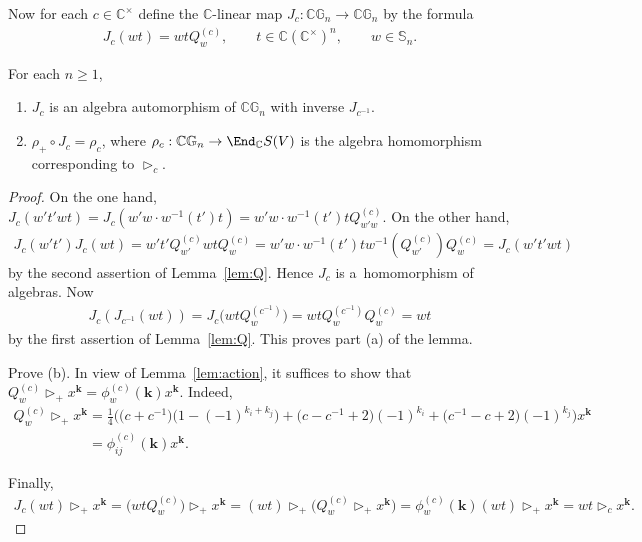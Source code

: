 Now for each $c\in\mathbb C^\times$ def\/ine the $\mathbb C$-linear map $J_c\colon \mathbb C\mathbb G_n\to \mathbb
C\mathbb G_n$ by the formula
\begin{gather*}
J_c(wt)=wtQ^{(c)}_w,
\qquad
t\in \mathbb C(\mathbb C^\times)^n,
\qquad
w\in \mathbb S_n.
\end{gather*}
\begin{Lemma}\label{lem:J_c}
For each $n\ge 1$,
\begin{enumerate}\itemsep=0pt
\item[$(a)$] $J_c$ is an algebra automorphism of $\mathbb C \mathbb G_n$ with inverse $J_{c^{-1}}$.

\item[$(b)$] $\rho_+\circ J_c=\rho_c$, where $\rho_c:\mathbb C \mathbb G_n\to \End_\mathbb C S(V)$ is the algebra homomorphism
corresponding to $\mathop{\triangleright}\nolimits_c$.
\end{enumerate}
\end{Lemma}

\begin{proof}
On the one hand, $J_c(w't'w t)=J_c(w'w\cdot w^{-1}(t')t)=w'w \cdot w^{-1}(t')tQ_{w'w}^{(c)}$.
On the other hand,
\begin{gather*}
J_c(w't')J_c(w t) = w't'Q_{w'}^{(c)} wt Q^{(c)}_w=w'w \cdot w^{-1}(t')tw^{-1}(Q_{w'}^{(c)}) Q_w^{(c)}=J_c(w't'wt)
\end{gather*}
by the second assertion of Lemma~\ref{lem:Q}.
Hence $J_c$ is a~homomorphism of algebras.
Now{\samepage
\begin{gather*}
J_c(J_{c^{-1}}(wt))=J_c\big(wtQ_w^{(c^{-1})}\big)=wtQ_w^{(c^{-1})}Q_w^{(c)}=wt
\end{gather*}
by the f\/irst assertion of Lemma~\ref{lem:Q}.
This proves part (a) of the lemma.}

Prove (b).
In view of Lemma~\ref{lem:action}, it suf\/f\/ices to show that $Q_w^{(c)}\mathop{\triangleright}\nolimits_+ x^{\mathbf
k}=\phi_w^{(c)}(\mathbf k) x^{\mathbf k}$.
Indeed,
\begin{gather*}
Q_w^{(c)}\mathop{\triangleright}\nolimits_+ x^{\mathbf k}
= \frac14 \big(\big(c+c^{-1}\big)\big(1-(-1)^{k_i+k_j}\big)+\big(c-c^{-1}+2\big)(-1)^{k_i}+\big(c^{-1}-c+2\big)(-1)^{k_j}\big)x^{\mathbf k}
\\
\phantom{Q_w^{(c)}\mathop{\triangleright}\nolimits_+ x^{\mathbf k}}
=\phi_{ij}^{(c)}(\mathbf k)x^{\mathbf k}.
\end{gather*}

Finally,
\begin{gather*}
 J_c(wt)\mathop{\triangleright}\nolimits_+ x^{\mathbf k}
=\big(wtQ_w^{(c)}\big)\mathop{\triangleright}\nolimits_+x^{\mathbf k}
=(wt)\mathop{\triangleright}\nolimits_+\big(Q_w^{(c)}\mathop{\triangleright}\nolimits_+x^{\mathbf k}\big)
=\phi_w^{(c)}(\mathbf k)(wt)\mathop{\triangleright}\nolimits_+x^{\mathbf k} =wt\mathop{\triangleright}\nolimits_c x^{\mathbf k}. \!\!\!\tag*{\qed}
\end{gather*}
\renewcommand{\qed}{}
\end{proof}

